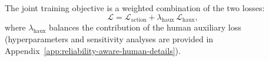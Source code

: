 \documentclass{article}
\begin{document}
The joint training objective is a weighted combination of the two losses:
\begin{equation}
\mathcal{L} = \mathcal{L}_{\mathrm{action}} + \lambda_{\mathrm{haux}}\, \mathcal{L}_{\mathrm{haux}},
\end{equation}
where $\lambda_{\mathrm{haux}}$ balances the contribution of the human auxiliary loss (hyperparameters and sensitivity analyses are provided in Appendix~\ref{app:reliability-aware-human-details}).


\end{document}
